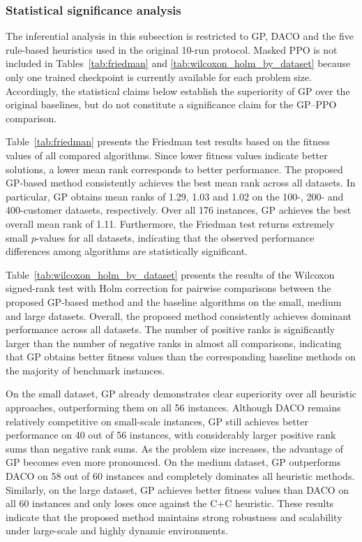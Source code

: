 \documentclass[pdflatex]{sn-jnl}
\begin{document}
\subsubsection{Statistical significance analysis}
The inferential analysis in this subsection is restricted to GP, DACO and the
five rule-based heuristics used in the original 10-run protocol. Masked PPO is
not included in Tables~\ref{tab:friedman} and
\ref{tab:wilcoxon_holm_by_dataset} because only one trained checkpoint is
currently available for each problem size. Accordingly, the statistical
claims below establish the superiority of GP over the original baselines, but
do not constitute a significance claim for the GP--PPO comparison.

Table~\ref{tab:friedman} presents the Friedman test results based on the fitness values of all compared algorithms. Since lower fitness values indicate better solutions, a lower mean rank corresponds to better performance. The proposed GP-based method consistently achieves the best mean rank across all datasets. In particular, GP obtains mean ranks of 1.29, 1.03 and 1.02 on the 100-, 200- and 400-customer datasets, respectively. Over all 176 instances, GP achieves the best overall mean rank of 1.11. Furthermore, the Friedman test returns extremely small $p$-values for all datasets, indicating that the observed performance differences among algorithms are statistically significant.

Table~\ref{tab:wilcoxon_holm_by_dataset} presents the results of the Wilcoxon signed-rank test with Holm correction for pairwise comparisons between the proposed GP-based method and the baseline algorithms on the small, medium and large datasets. Overall, the proposed method consistently achieves dominant performance across all datasets. The number of positive ranks is significantly larger than the number of negative ranks in almost all comparisons, indicating that GP obtains better fitness values than the corresponding baseline methods on the majority of benchmark instances.

On the small dataset, GP already demonstrates clear superiority over all heuristic approaches, outperforming them on all 56 instances. Although DACO remains relatively competitive on small-scale instances, GP still achieves better performance on 40 out of 56 instances, with considerably larger positive rank sums than negative rank sums. As the problem size increases, the advantage of GP becomes even more pronounced. On the medium dataset, GP outperforms DACO on 58 out of 60 instances and completely dominates all heuristic methods. Similarly, on the large dataset, GP achieves better fitness values than DACO on all 60 instances and only loses once against the C+C heuristic. These results indicate that the proposed method maintains strong robustness and scalability under large-scale and highly dynamic environments.
\end{document}
